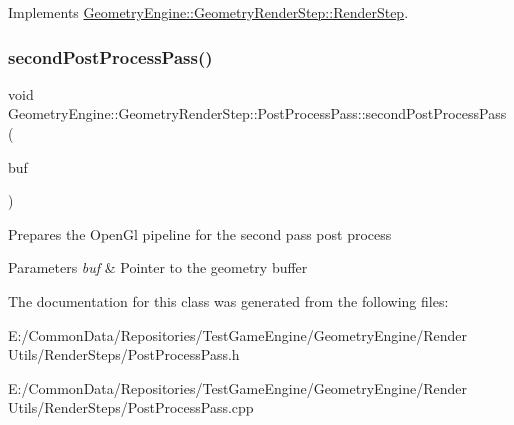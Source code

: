 Implements \mbox{\hyperlink{class_geometry_engine_1_1_geometry_render_step_1_1_render_step_a9b054ee8f38304319a9d03ba3e173dcd}{Geometry\+Engine\+::\+Geometry\+Render\+Step\+::\+Render\+Step}}.

\mbox{\label{class_geometry_engine_1_1_geometry_render_step_1_1_post_process_pass_a3d555943a9bc2b3105e71b8984b1ce0b}} 
\subsubsection{\texorpdfstring{secondPostProcessPass()}{secondPostProcessPass()}}
{\footnotesize\ttfamily void Geometry\+Engine\+::\+Geometry\+Render\+Step\+::\+Post\+Process\+Pass\+::second\+Post\+Process\+Pass (\begin{DoxyParamCaption}\item[{\mbox{\hyperlink{class_geometry_engine_1_1_geometry_buffer_1_1_g_buffer}{Geometry\+Buffer\+::\+G\+Buffer}} $\ast$}]{buf }\end{DoxyParamCaption})\hspace{0.3cm}{\ttfamily [protected]}}

Prepares the Open\+Gl pipeline for the second pass post process 
\begin{DoxyParams}{Parameters}
{\em buf} & Pointer to the geometry buffer \\
\hline
\end{DoxyParams}


The documentation for this class was generated from the following files\+:\begin{DoxyCompactItemize}
\item 
E\+:/\+Common\+Data/\+Repositories/\+Test\+Game\+Engine/\+Geometry\+Engine/\+Render Utils/\+Render\+Steps/Post\+Process\+Pass.\+h\item 
E\+:/\+Common\+Data/\+Repositories/\+Test\+Game\+Engine/\+Geometry\+Engine/\+Render Utils/\+Render\+Steps/Post\+Process\+Pass.\+cpp\end{DoxyCompactItemize}
